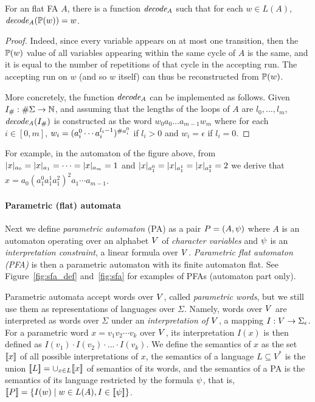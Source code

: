 \documentclass[sigplan,review,anonymous]{acmart}\settopmatter{printfolios=true,printccs=false,printacmref=false}
\begin{document}
\begin{lemma}\label{lemma:decoding}
For an flat FA $A$, there is a function $\mathit{decode_{A}}$ such that for each $w\in L(A)$, $\mathit{decode_{A}}(\mathbb{P}{(w)}) = w$. 
\end{lemma}
%
\begin{proof}
Indeed, since every variable appears on at most one transition, then the $\mathbb{P}{(w)}$ value of all variables appearing within the same cycle of $A$ is the same, and it is equal to the number of repetitions of that cycle in the accepting run. 
%
The accepting run on $w$ (and so $w$ itself) can thus be reconstructed from $\mathbb{P}{(w)}$. 

More concretely, the function $\mathit{decode_{A}}$ can be implemented as follows. 
Given $I_{\#}:\#\Sigma\rightarrow\mathbb{N}$,
and assuming that the lengths of the loops of $A$ are $l_0,\ldots,l_{m}$, 
$\mathit{decode_{A}}(I_{\#})$ is constructed as the word $w_0 a_{0} \ldots a_{m-1} w_{m}$ where for each $i\in [0,m]$,
$w_i = (a_i^0 \cdots a_i^{l_{i}-1})^{\#{a_i^0}}$ if $l_i >0$ and $w_i = \epsilon$ if $l_i = 0$. 
\end{proof}
%
For example, in the automaton of the figure above, 
from $|x|_{a_0} = |x|_{a_1} = \cdots = |x|_{a_{m}}=1$ and $|x|_{a^0_1}=|x|_{a^1_1}=|x|_{a^2_1}=2$ we derive that $x=a_0(a^0_1a^1_1a^2_1)^2a_1\cdots a_{m-1}$. 

\paragraph{Parametric (flat) automata}
Next we define \emph{parametric automaton} (PA) as a pair  $P = (A,\psi)$ where 
$A$ is an automaton operating over an alphabet $V$ of \emph{character variables}  
and $\psi$ is an \emph{interpretation constraint}, a linear formula over $V$. 
\emph{Parametric flat automaton (PFA)} is then a parametric automaton with its finite automaton flat. See Figure~\ref{fig:sfa_def} and~\ref{fig:sfa} for examples of PFAs (automaton part only).

Parametric automata accept words over $V$, called \emph{parametric words}, but we still use them as representations of languages over $\Sigma$. 
%
Namely, words over $V$ are interpreted as words over $\Sigma$ under an
\emph{interpretation of $V$},
%
a mapping $I:V\rightarrow\Sigma_\epsilon$. 
For a parametric word $x= v_1v_2\cdots v_k$ over $V$, its interpretation $I(x)$ is then defined as $I(v_1)\cdot I(v_2)\cdot \ldots \cdot I(v_k)$.
%
We define the semantics of $x$ as the set $[\![x]\!]$ of all possible interpretations of $x$, the semantics of a language $L\subseteq V^*$ is the union $[\![L]\!] = \cup_{x\in L} [\![x]\!]$ of semantics of its words, and the semantics of a PA is the semantics of its language restricted by the formula $\psi$, that is,  
$[\![P]\!] = \{I(w) \mid w\in L(A),I\in[\![\psi]\!]\}$. 
\end{document}
